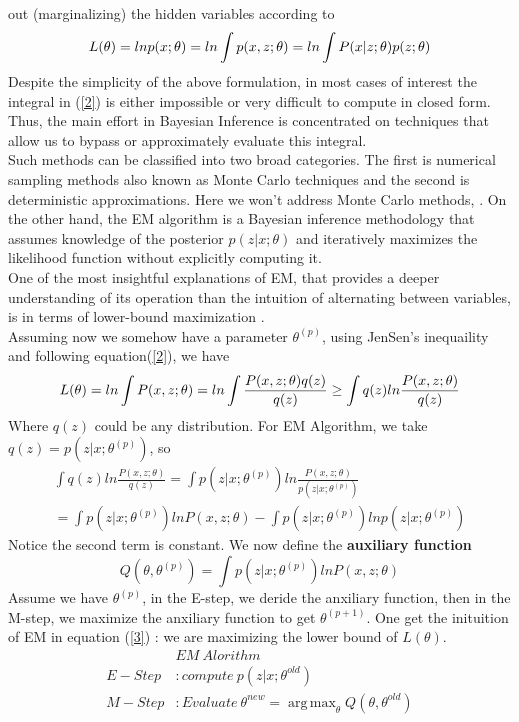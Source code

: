 \documentclass[11pt]{article}
\DeclareMathOperator*{\argmax}{arg\,max}
\begin{document}
out (marginalizing) the hidden variables according to
\begin{equation}{\label{2}}
L(\theta) = lnp(x;\theta) = ln \int p(x,z;\theta) = ln \int P(x|z;\theta)p(z;\theta) 
\end{equation}
Despite the simplicity of the above formulation, in most cases of interest the integral in (\ref{2}) is either impossible or very difficult to compute in closed form. Thus, the main effort in Bayesian Inference is concentrated on techniques that allow us to bypass or approximately evaluate this integral.  \\
Such methods can be classified into two broad categories\cite{LifeAfter}. The first is numerical sampling methods also known as Monte Carlo techniques and the second is deterministic approximations. Here we won't address Monte Carlo methods\cite{2003MC}, \cite{MCMC}. On the other hand, the EM algorithm is a Bayesian inference methodology that assumes knowledge of the posterior $p(z|x;\theta)$ and iteratively maximizes the likelihood function without explicitly computing it.\\
One of the most insightful explanations of EM, that provides a deeper understanding of its operation than the intuition of alternating between variables, is in terms of lower-bound maximization \cite{neal}.\\
Assuming now we somehow have a parameter $\theta^{(p)}$, using JenSen's inequaility and following equation(\ref{2}), we have
\begin{equation}{\label{3}}
L(\theta) = ln \int P(x, z;\theta) = ln \int \frac{P(x, z;\theta)q(z)}{q(z)}
\geq \int q(z) ln\frac{P(x,z;\theta)}{q(z)}
\end{equation}
Where $q(z)$ could be any distribution. For EM Algorithm, we take $q(z) = p(z|x; \theta^{(p)})$, so
\begin{equation}
\begin{split}
\int q(z) ln\frac{P(x,z;\theta)}{q(z)} = \int p(z|x; \theta^{(p)}) ln\frac{P(x,z;\theta)}{p(z|x; \theta^{(p)})} \\ 
= \int p(z|x; \theta^{(p)}) lnP(x,z;\theta) - \int p(z|x; \theta^{(p)})lnp(z|x; \theta^{(p)})
\end{split}
\end{equation}
Notice the second term is constant. We now define the \textbf{auxiliary function}
\begin{equation}
Q(\theta, \theta^{(p)}) = \int p(z|x; \theta^{(p)}) lnP(x,z;\theta)
\end{equation}
Assume we have $\theta^{(p)}$, in the E-step, we deride the anxiliary function, then in the M-step, we maximize the anxiliary function to get $\theta^{(p+1)}$. One get the inituition of EM in equation (\ref{3}) : we are maximizing the lower bound of $L(\theta)$.
\begin{equation}
\begin{split}
&EM~Alorithm \\
E-Step &: compute~p(z|x;\theta^{old})\\
M-Step &: Evaluate~\theta^{new}=\argmax_{\theta}Q(\theta,\theta^{old})
\end{split}
\end{equation}
\end{document}
